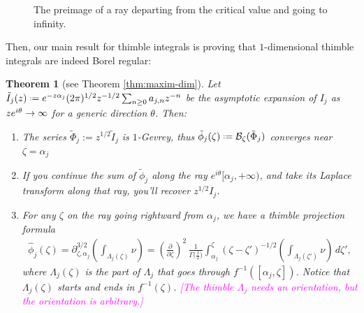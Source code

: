 \documentclass{article}
\let\Re\relax
\DeclareMathOperator{\Re}{Re}
\theoremstyle{definition}
\newcommand{\fracderiv}[3]{\partial^{#1}_{#2, #3}}
\newcommand*{\defeq}{\mathrel{\vcenter{\baselineskip0.5ex \lineskiplimit0pt
                     \hbox{\scriptsize.}\hbox{\scriptsize.}}}%
                     =}
\newcommand{\borel}{\mathcal{B}}
\theoremstyle{plain}
\newtheorem{theorem}{Theorem}[section]
\begin{document}
\begin{figure}[ht]
    \centering
    \caption{The preimage of a ray departing from the critical value and going to infinity.}
    \label{fig:thimble_vs_rays}
\end{figure}
Then, our main result for thimble integrals is proving that $1$-dimensional thimble integrals are indeed Borel regular:
\begin{theorem}[see Theorem \ref{thm:maxim-dim}]\label{thm:maxim}
    Let $\tilde{I}_{j}(z)\defeq e^{-z \alpha_j}(2\pi)^{1/2} z^{-1/2} \sum_{n\geq 0}a_{j,n}z^{-n}$ be the asymptotic expansion of $I_j$ as $\Re z e^{i\theta}\to \infty$ for a generic direction $\theta$. Then:
\begin{enumerate}
\item The series $\tilde{\Phi}_j:=z^{1/2} \tilde{I}_j$ is $1$-Gevrey, thus $\tilde{\phi}_j(\zeta)\defeq\borel_\zeta(\tilde{\Phi}_j)$ converges near $\zeta=\alpha_j$
\item If you continue the sum of $\tilde{\phi}_j$ along the ray $ e^{i\theta}[\alpha_j,+\infty)$, and take its Laplace transform along that ray, you'll recover $z^{1/2} I_j$.
\item\label{part3} For any $\zeta$ on the ray going rightward from $\alpha_j$, we have a \textit{thimble projection formula}
\begin{multline}\label{eqn:formula}
\hat{\phi}_{j}(\zeta)=\fracderiv{3/2}{\zeta}{\alpha_j} \left( \int_{\Lambda_j(\zeta)}\nu \right)=\left(\tfrac{\partial}{\partial \zeta}\right)^2\,\frac{1}{\Gamma\big(\tfrac{1}{2}\big)} \int_{\alpha_j}^\zeta (\zeta-\zeta')^{-1/2}\left( \int_{\Lambda_j(\zeta')} \nu \right)\,d\zeta',
\end{multline}
where $\Lambda_j(\zeta)$ is the part of $\Lambda_j$ that goes through $f^{-1}([\alpha_j, \zeta])$. Notice that $\Lambda_j(\zeta)$ starts and ends in $f^{-1}(\zeta)$. \textcolor{magenta}{[The thimble $\Lambda_j$ needs an orientation, but the orientation is arbitrary.]}
\end{enumerate}
\end{theorem}
\end{document}
